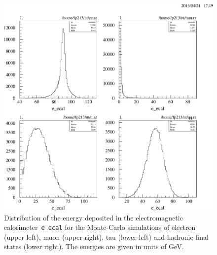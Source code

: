 \documentclass[11pt, a4paper]{article}
\numberwithin{equation}{section}
\begin{document}
\begin{appendix}
\begin{figure}[h]
	\centering
	\includegraphics[width=1\textwidth]{./data/tag2/uncut/cropped/e_ecal_uncut.pdf}
	\caption{Distribution of the energy deposited in the electromagnetic calorimeter~\texttt{e\_ecal} for the Monte-Carlo simulations of electron (upper left), muon (upper right), tau (lower left) and hadronic final states (lower right). The energies are given in units of GeV.}
\end{figure}


\end{appendix}
\end{document}
